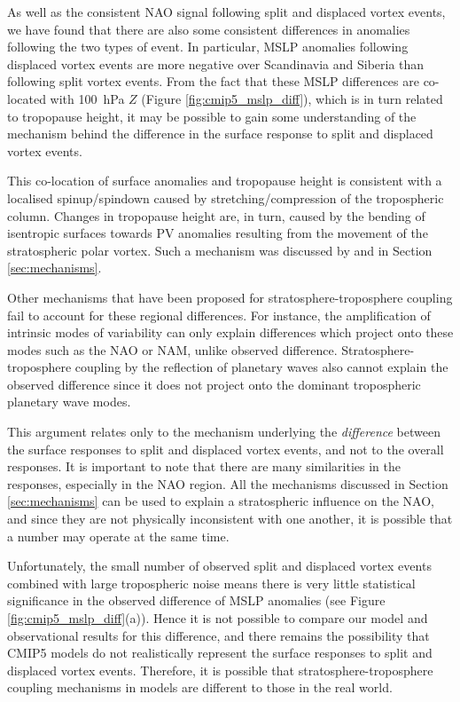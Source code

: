 As well as the consistent NAO signal following split and displaced vortex
events, we have found that there are also some consistent differences in
anomalies following the two types of event. In particular, MSLP anomalies
following displaced vortex events are more negative over Scandinavia and Siberia
than following split vortex events. From the fact that these MSLP differences
are co-located with 100~hPa $Z$ (Figure \ref{fig:cmip5_mslp_diff}), which is in
turn related to tropopause height, it may be possible to gain some understanding
of the mechanism behind the difference in the surface response to split and
displaced vortex events. 

This co-location of surface anomalies and tropopause height is consistent with a
localised spinup/spindown caused by stretching/compression of the tropospheric
column. Changes in tropopause height are, in turn, caused by the bending of
isentropic surfaces towards PV anomalies resulting from the movement of the
stratospheric polar vortex. Such a mechanism was discussed by \citet{Ambaum2002}
and in Section \ref{sec:mechanisms}.

Other mechanisms that have been proposed for stratosphere-troposphere coupling
fail to account for these regional differences. For instance, the amplification
of intrinsic modes of variability \citep{Robinson1991} can only explain
differences which project onto these modes such as the NAO or NAM, unlike
observed difference. Stratosphere-troposphere coupling by the reflection of
planetary waves \citep{JudithPerlwitz2003,Shaw2010} also cannot explain the
observed difference since it  does not project onto the dominant tropospheric
planetary wave modes. 

This argument relates only to the mechanism underlying the \emph{difference}
between the surface responses to split and displaced vortex events, and not to
the overall responses. It is important to note that there are many similarities
in the responses, especially in the NAO region. All the mechanisms discussed in
Section \ref{sec:mechanisms} can be used to explain a stratospheric influence on
the NAO, and since they are not physically inconsistent with one another, it is
possible that a number may operate at the same time.

Unfortunately, the small number of observed split and displaced vortex events
combined with large tropospheric noise means there is very little statistical
significance in the observed difference of MSLP anomalies (see Figure
\ref{fig:cmip5_mslp_diff}(a)). Hence it is not possible to compare our model and
observational results for this difference, and there remains the
possibility that CMIP5 models do not realistically represent the surface
responses to split and displaced vortex events. Therefore, it is possible that
stratosphere-troposphere coupling mechanisms in models are different to those in
the real world. 

